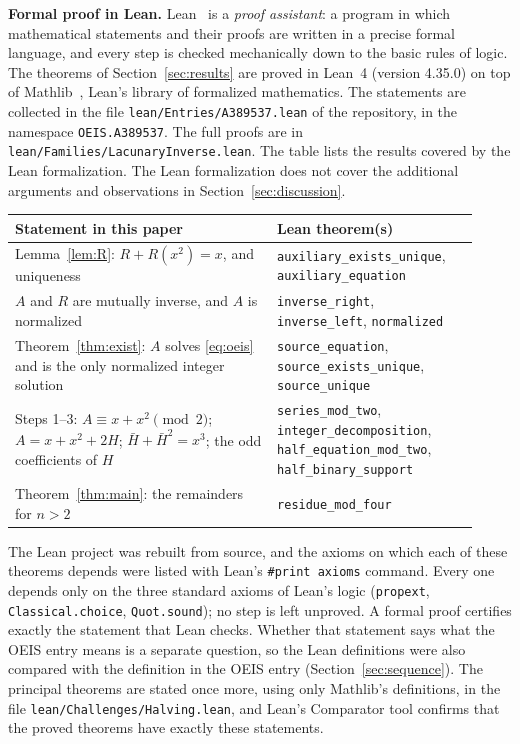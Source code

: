 \documentclass[11pt,a4paper]{article}
\theoremstyle{definition}
\theoremstyle{remark}
\newcommand{\para}[1]{\par\medskip\noindent\textbf{#1}\enspace}
\begin{document}
\para{Formal proof in Lean.}
Lean~\cite{lean} is a \emph{proof assistant}: a program in which mathematical statements and their proofs are written
in a precise formal language, and every step is checked mechanically down to the basic rules of logic. The theorems of Section~\ref{sec:results} are proved in Lean~4 (version 4.35.0) on top of
Mathlib~\cite{mathlib}, Lean's library of formalized mathematics. The statements are collected in the file \texttt{lean/Entries/A389537.lean} of the repository,
in the namespace \texttt{OEIS.A389537}. The full proofs are in \texttt{lean/Families/LacunaryInverse.lean}.
The table lists the results covered by the Lean formalization. The Lean formalization does not cover the additional arguments and observations in Section~\ref{sec:discussion}.
\begin{center}\small\renewcommand{\arraystretch}{1.25}
\begin{tabular}{>{\raggedright\arraybackslash}p{0.52\linewidth}>{\raggedright\arraybackslash}p{0.4\linewidth}}
\toprule
Statement in this paper & Lean theorem(s)\\
\midrule
Lemma~\ref{lem:R}: $R+R(x^2)=x$, and uniqueness & \texttt{auxiliary\_\allowbreak{}exists\_\allowbreak{}unique}, \texttt{auxiliary\_\allowbreak{}equation} \\
$A$ and $R$ are mutually inverse, and $A$ is normalized & \texttt{inverse\_\allowbreak{}right}, \texttt{inverse\_\allowbreak{}left}, \texttt{normalized} \\
Theorem~\ref{thm:exist}: $A$ solves \eqref{eq:oeis} and is the only normalized integer solution & \texttt{source\_\allowbreak{}equation}, \texttt{source\_\allowbreak{}exists\_\allowbreak{}unique}, \texttt{source\_\allowbreak{}unique} \\
Steps 1--3: $A\equiv x+x^2\pmod2$; $A=x+x^2+2H$; $\bar H+\bar H^2=x^3$; the odd coefficients of $H$ & \texttt{series\_\allowbreak{}mod\_\allowbreak{}two}, \texttt{integer\_\allowbreak{}decomposition}, \texttt{half\_\allowbreak{}equation\_\allowbreak{}mod\_\allowbreak{}two}, \texttt{half\_\allowbreak{}binary\_\allowbreak{}support} \\
Theorem~\ref{thm:main}: the remainders for $n>2$ & \texttt{residue\_\allowbreak{}mod\_\allowbreak{}four} \\
\bottomrule
\end{tabular}
\end{center}
The Lean project was rebuilt from source, and the axioms on which each of these theorems depends were listed with
Lean's \texttt{\#print axioms} command. Every one depends only on the three standard axioms of Lean's logic
(\texttt{propext}, \texttt{Classical.choice}, \texttt{Quot.sound}); no step is left unproved. A formal proof certifies
exactly the statement that Lean checks. Whether that statement says what the OEIS entry means is a separate question,
so the Lean definitions were also compared with the definition in the OEIS entry
(Section~\ref{sec:sequence}). The principal theorems are stated once more, using only Mathlib's definitions, in the
file \texttt{lean/Challenges/Halving.lean}, and Lean's Comparator tool confirms that the
proved theorems have exactly these statements.
\end{document}

